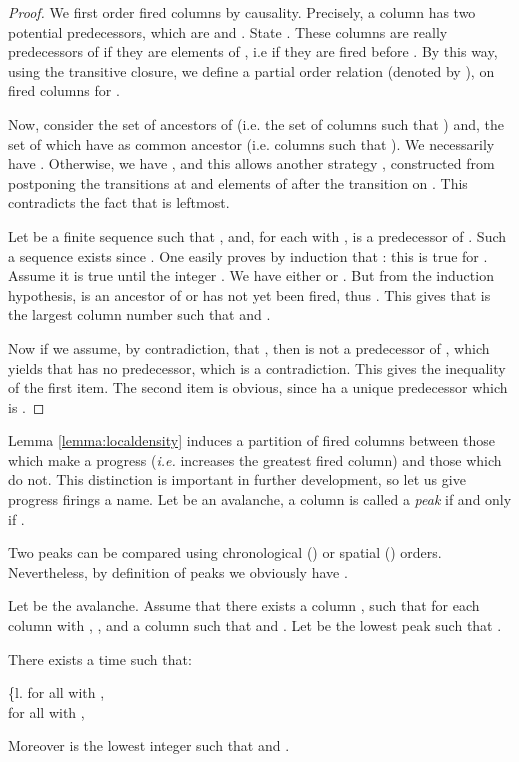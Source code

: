 \documentclass[11pt,a4paper]{llncs}
\begin{document}
\begin{proof}
We first order fired columns by causality. Precisely, a column  has  two potential predecessors, which are
 and   . State . These columns are really predecessors of  if they are elements of , i.e if they are fired before . By this way, using the transitive closure,  we define a partial order relation (denoted by ),  on fired columns for .

Now,  consider the set  of ancestors of  (i.e.  the set of columns  such that )  and,    the set  of which have   as common ancestor (i.e. columns  such that ).
We necessarily have  .   Otherwise, we have  , and this  allows  another strategy , constructed from  postponing the transitions at   and elements of  after the transition on  . This contradicts the fact that  is leftmost.

Let   be a finite sequence such that ,  and,  for each  with ,  is a predecessor of . Such a sequence exists since . One easily proves by induction that : 
this is true for . Assume it is true until the integer . We have either  or  . But from the induction hypothesis,  is an ancestor of  or has not yet been fired, thus .  This gives that     is the largest column number  such that  and . 

Now if we assume, by contradiction, that  , then   is not a predecessor of , which yields that  has no predecessor, which is a contradiction. This gives the  inequality   of the first item. 
The second item  is obvious, since  ha a unique predecessor which is . 
\end{proof}

Lemma \ref{lemma:localdensity} induces a partition of fired columns between those which make a progress ({\em i.e.} increases the greatest fired column) and those which do not. This distinction is important in further development, so let us give progress firings a name. Let  be an avalanche, a column  is called a {\em peak} if and only if .

\begin{remark}\label{remark:order}
  Two peaks  can be compared using chronological () or spatial () orders. Nevertheless, by definition of peaks we obviously have .
\end{remark}

\begin{lemma}\label{lemma:D-1}
  Let  be the  avalanche. Assume that  there exists a column  ,  such that for each column   with , , and a column  such that  and . Let   be  the lowest peak such that  .
  
There exists a time   such that:

 \begin{tabular}[t]\{{l}. 
 for all  with , \\
  for all  with , 
   \end{tabular}
   
  Moreover  is the lowest integer such that   and . 
\end{lemma}
\end{document}
